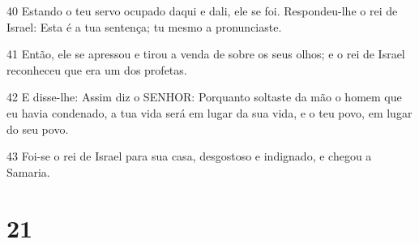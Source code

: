 \par 40 Estando o teu servo ocupado daqui e dali, ele se foi. Respondeu-lhe o rei de Israel: Esta é a tua sentença; tu mesmo a pronunciaste.
\par 41 Então, ele se apressou e tirou a venda de sobre os seus olhos; e o rei de Israel reconheceu que era um dos profetas.
\par 42 E disse-lhe: Assim diz o SENHOR: Porquanto soltaste da mão o homem que eu havia condenado, a tua vida será em lugar da sua vida, e o teu povo, em lugar do seu povo.
\par 43 Foi-se o rei de Israel para sua casa, desgostoso e indignado, e chegou a Samaria.

\chapter{21}


